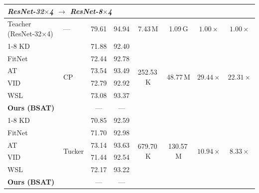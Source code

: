 \documentclass[conference]{IEEEtran}
\begin{document}
\begin{table}[t]
\begin{tabular}{llcccccc}
    \multicolumn{8}{l}{\textit{ResNet-32$\times$4 $\to$ ResNet-8$\times$4}} \\
    \midrule
    Teacher (ResNet-32$\times$4) & — & 79.61 & 94.94 & 7.43\,M & 1.09\,G & $1.00\times$ & $1.00\times$ \\
    \cline{1-8}
    KD \cite{hinton2015distilling}                 & \multirow{6}{*}{CP}     & 71.88 & 92.40 & \multirow{6}{*}{252.53\,K} & \multirow{6}{*}{48.77\,M} & \multirow{6}{*}{$29.44\times$}    & \multirow{6}{*}{$22.31\times$} \\
    FitNet \cite{romero2015fitnetshintsdeepnets}   &                         & 72.44 & 92.78 & & & & \\
    AT \cite{zagoruyko2016paying}                  &                         & 73.54 & 93.49 & & & & \\
    VID \cite{ahn2019variational}                  &                         & 72.79 & 92.92 & & & & \\
    WSL \cite{zhou2021rethinking}                  &                         & 73.08 & 93.37 & & & & \\
    \textbf{Ours (BSAT)}                           &                         & — & — & & & & \\
    \cline{1-8}
    KD \cite{hinton2015distilling}                 & \multirow{6}{*}{Tucker} & 70.85 & 92.59 & \multirow{6}{*}{679.70\,K} & \multirow{6}{*}{130.57\,M} & \multirow{6}{*}{$10.94\times$}   & \multirow{6}{*}{$8.33\times$} \\
    FitNet \cite{romero2015fitnetshintsdeepnets}   &                         & 71.70 & 92.98 & & & & \\
    AT \cite{zagoruyko2016paying}                  &                         & 73.14 & 93.63 & & & & \\
    VID \cite{ahn2019variational}                  &                         & 71.44 & 92.54 & & & & \\
    WSL \cite{zhou2021rethinking}                  &                         & 72.17 & 93.22 & & & & \\
    \textbf{Ours (BSAT)}                           &                         & — & — & & & & \\
    \bottomrule
  \end{tabular}
\end{table}
\end{document}
